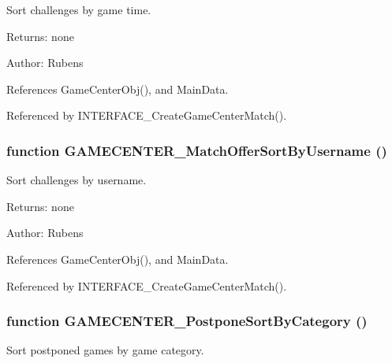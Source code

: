 Sort challenges by game time. 

\begin{Desc}
\item[Returns:]none \end{Desc}
\begin{Desc}
\item[Author:]Rubens \end{Desc}


References GameCenterObj(), and MainData.

Referenced by INTERFACE\_\-CreateGameCenterMatch().
\subsubsection[GAMECENTER\_\-MatchOfferSortByUsername]{\setlength{\rightskip}{0pt plus 5cm}function GAMECENTER\_\-MatchOfferSortByUsername ()}\label{gamecenter_2gamecenter_8js_370d4923f5ec2add98bb85806c3c075d}


Sort challenges by username. 

\begin{Desc}
\item[Returns:]none \end{Desc}
\begin{Desc}
\item[Author:]Rubens \end{Desc}


References GameCenterObj(), and MainData.

Referenced by INTERFACE\_\-CreateGameCenterMatch().
\subsubsection[GAMECENTER\_\-PostponeSortByCategory]{\setlength{\rightskip}{0pt plus 5cm}function GAMECENTER\_\-PostponeSortByCategory ()}\label{gamecenter_2gamecenter_8js_5893cb4ee56c934746afe814ab33def9}


Sort postponed games by game category. 

